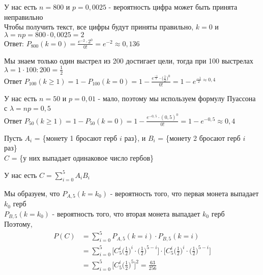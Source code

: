 \begin{exercise}[9]
	У нас есть $n=800$ и $p=0,0025$ - вероятность цифра может быть принята неправильно \\ Чтобы получить текст, все цифры будут приняты правильно, $k=0$ и $\lambda = np = 800 \cdot 0,0025 = 2$ \\ Ответ: $P_{800}(k=0) = \frac{e^{-2} \cdot 2^0}{0!} = e^{-2} \approx 0,136$
\end{exercise}

\begin{exercise}[10]
	Мы знаем только один выстрел из 200 достигает цели, тогда при 100 выстрелах $\lambda = 1 \cdot 100 : 200 = \frac{1}{2}$ \\ Ответ $P_{100}(k \geq 1) = 1 - P_{100} (k = 0) = 1 - \frac{e^{\frac{-1}{2}} \cdot \Big(\frac{1}{2}\Big)^0}{0!} = 1 - e^{\frac{-1}{2} \approx 0,4}$
\end{exercise}

\begin{exercise}[11]
	У нас есть $n=50$ и $p=0,01$ - мало, поэтому мы используем формулу Пуассона с $\lambda = np = 0,5$ \\ Ответ $P_{50} (k \geq 1) = 1 - P_{50} (k = 0) = 1 - \frac{e^{-0,5} \cdot (0,5)^0}{0!} = 1 - e^{-0,5} \approx 0,4$
\end{exercise}

\begin{exercise}[12]
	Пусть $A_i$ = \{монету 1 бросают герб $i$ раз\}, и $B_i$ = \{монету 2 бросают герб $i$ раз\} \\ $C$ = \{у них выпадает одинаковое число гербов\}
	
	У нас есть $C = \sum_{i=0}^{5} A_i B_i$
	
	Мы образуем, что $P_{A, 5}(k=k_0)$ - вероятность того, что первая монета выпадает $k_0$ герб \\ $P_{B, 5}(k=k_0)$ - вероятность того, что вторая монета выпадает $k_0$ герб \\ Поэтому, 
	\begin{align*}
		P(C) & = \sum_{i=0}^{5} P_{A, 5}(k=i) \cdot P_{B, 5}(k=i) \\ & = \sum_{i=0}^{5} \Big[C^i_5 \Big(\frac{1}{2}\Big)^i \cdot \Big(\frac{1}{2}\Big)^{5-i}\Big] \cdot \Big[C^i_5 \Big(\frac{1}{2}\Big)^i \cdot \Big(\frac{1}{2}\Big)^{5-i}\Big] \\ & = \sum_{i=0}^{5} \Big[C^i_5 \Big(\frac{1}{2}\Big)^5\Big]^2 = \frac{63}{256}
	\end{align*}
\end{exercise}

